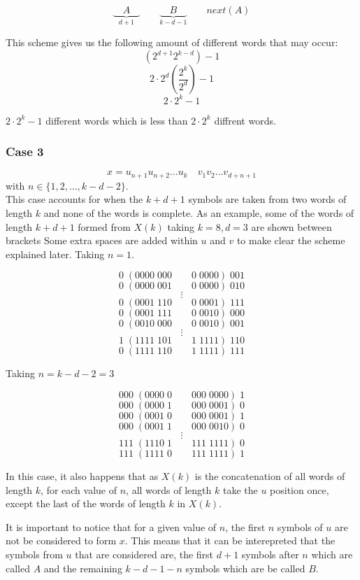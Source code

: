 \documentclass[11pt,a4paper]{tesis}
\theoremstyle{definition}
\begin{document}
$$\underbrace{\quad A \quad }_{d +1} \qquad \underbrace{\quad B \quad }_{k - d - 1}  \qquad next(A)$$

This scheme gives us the following amount of different words that may occur:
$$(2^{d + 1} 2^{k-d})-1$$
$$ 2\cdot 2^d  (\frac{2^k}{2^d}) - 1$$
$$ 2 \cdot 2^k - 1$$

$ 2 \cdot 2^k - 1 $ different words which is less than $2 \cdot 2^k$ diffrent words.

\subsubsection{Case 3}
$$x = u_{n+1} u_{n+2} \dots u_k \quad  v_1 v_2 \dots v_{d+n+1} $$
with $n \in \{1,2,\dots ,k - d - 2\}$.
\\

This case accounts for when the $k + d + 1$ symbols are taken from two words of length $k$ and none of the words is complete.
As an example, some of the words of length $k + d + 1$ formed from $X(k)$ taking $k = 8, d = 3$ are shown between brackets
Some extra spaces are added within $u$ and $v$ to make clear the scheme explained later.
Taking $n = 1$.


$$0\; (0000\; 000 \qquad 0 \;0000 ) \;001$$
$$0\; (0000 \;001 \qquad 0 \;0000 ) \;010$$
$$\vdots$$
$$0\; (0001 \;110 \qquad 0 \;0001 ) \;111$$
$$0\; (0001 \;111 \qquad 0 \;0010 ) \;000$$
$$0\; (0010 \;000 \qquad 0 \;0010 ) \;001$$
$$\vdots$$
$$1\; (1111 \;101 \qquad 1 \;1111 ) \;110$$
$$0\; (1111 \;110 \qquad 1 \;1111 ) \;111$$

Taking $n = k - d - 2 = 3$

$$000\; (0000\; 0 \qquad 000 \;0000 ) \;1$$
$$000\; (0000\; 1 \qquad 000 \;0001 ) \;0$$
$$000\; (0001\; 0 \qquad 000 \;0001 ) \;1$$
$$000\; (0001\; 1 \qquad 000 \;0010 ) \;0$$
$$\vdots$$
$$111\; (1110\; 1 \qquad 111 \;1111 ) \;0$$
$$111\; (1111\; 0 \qquad 111 \;1111 ) \;1$$

In this case, it also happens that as $X(k)$ is the concatenation of all words of length $k$, for each value of $n$, all words of length $k$ take the $u$ position once, except the last of the words of length $k$ in $X(k)$.

It is important to notice that for a given value of $n$, the first $n$ symbols of $u$ are not be considered to form $x$. This means that it can be interepreted that the symbols from  $u$ that are considered are, the first $d + 1$ symbols after $n$ which are called $A$ and the remaining $k - d - 1 - n$ symbols which are be called $B$.
\end{document}

